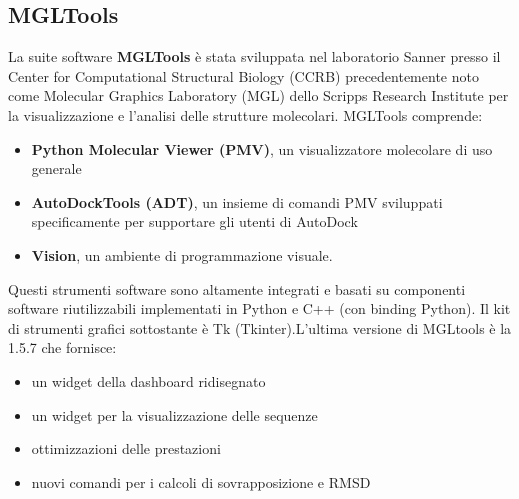 \subsection{MGLTools}
La suite software \textbf{MGLTools} è stata sviluppata nel laboratorio Sanner presso il Center for Computational Structural Biology (CCRB) precedentemente noto come Molecular Graphics Laboratory (MGL) dello Scripps Research Institute per la visualizzazione e l'analisi delle strutture molecolari. MGLTools comprende:

\begin{itemize}
    \item \textbf{Python Molecular Viewer (PMV)}, un visualizzatore molecolare di uso generale
    \item \textbf{AutoDockTools (ADT)}, un insieme di comandi PMV sviluppati specificamente per supportare gli utenti di AutoDock
    \item \textbf{Vision}, un ambiente di programmazione visuale.
\end{itemize}

Questi strumenti software sono altamente integrati e basati su componenti software riutilizzabili implementati in Python e C++ (con binding Python). Il kit di strumenti grafici sottostante è Tk (Tkinter).L'ultima versione di MGLtools è la 1.5.7 che fornisce:

\begin{itemize}
    \item un widget della dashboard ridisegnato
    \item un widget per la visualizzazione delle sequenze
    \item ottimizzazioni delle prestazioni
    \item nuovi comandi per i calcoli di sovrapposizione e RMSD
\end{itemize}

